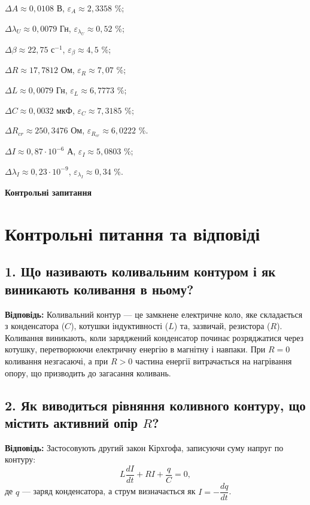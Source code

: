 \documentclass[12pt,a4paper]{article}
\begin{document}
    $\Delta A \approx 0,0108$ В, $\varepsilon_A \approx 2,3358$ \%;

    $\Delta \lambda_U \approx 0,0079$ Гн, $\varepsilon_{\lambda_U} \approx 0,52$ \%;

    $\Delta \beta \approx 22,75 \text{ с}^{-1}$, $\varepsilon_{\beta} \approx 4,5$ \%;

    $\Delta R \approx 17,7812$ Ом, $\varepsilon_R \approx 7,07$ \%;

    $\Delta L \approx 0,0079$ Гн, $\varepsilon_L \approx 6,7773$ \%;

    $\Delta C \approx 0,0032$ мкФ, $\varepsilon_C \approx 7,3185$ \%;

    $\Delta R_{cr} \approx 250,3476$ Ом, $\varepsilon_{R_{cr}} \approx 6,0222$ \%.

    $\Delta I \approx 0,87 \cdot 10^{-6}$ А, $\varepsilon_I \approx 5,0803$ \%;

    $\Delta \lambda_I \approx 0,23 \cdot 10^{-9}$, $\varepsilon_{\lambda_I} \approx 0,34$ \%.

    \vspace{3em}

    \newpage

    \begin{center}
        \textbf{\Large Контрольні запитання}
    \end{center}

    \section*{Контрольні питання та відповіді}

    \subsection*{1. Що називають коливальним контуром і як виникають коливання в ньому?}
    \textbf{Відповідь:}  
    Коливальний контур --- це замкнене електричне коло, яке складається з конденсатора ($C$), котушки індуктивності ($L$) та, зазвичай, резистора ($R$). Коливання виникають, коли заряджений конденсатор починає розряджатися через котушку, перетворюючи електричну енергію в магнітну і навпаки. При $R=0$ коливання незгасаючі, а при $R>0$ частина енергії витрачається на нагрівання опору, що призводить до загасання коливань.

    \subsection*{2. Як виводиться рівняння коливного контуру, що містить активний опір $R$?}
    \textbf{Відповідь:}  
    Застосовують другий закон Кірхгофа, записуючи суму напруг по контуру:
    \[
    L\frac{dI}{dt} + RI + \frac{q}{C} = 0,
    \]
    де $q$ --- заряд конденсатора, а струм визначається як $I=-\dfrac{dq}{dt}$.
\end{document}
